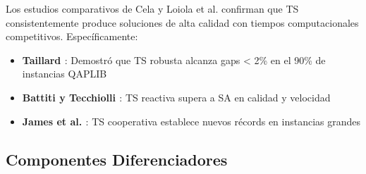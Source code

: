 \documentclass[12pt, a4paper]{article}
\begin{document}
\begin{table}[H]
\centering
\caption{Comparación de metaheurísticas para QAP basada en literatura}
\label{tab:comparacion_meta}
\end{table}

Los estudios comparativos de Cela \cite{cela1998} y Loiola et al. \cite{loiola2007} confirman que TS consistentemente produce soluciones de alta calidad con tiempos computacionales competitivos. Específicamente:

\begin{itemize}
    \item \textbf{Taillard \cite{taillard1991}}: Demostró que TS robusta alcanza gaps < 2\% en el 90\% de instancias QAPLIB
    \item \textbf{Battiti y Tecchiolli \cite{battiti1994}}: TS reactiva supera a SA en calidad y velocidad
    \item \textbf{James et al. \cite{james2009}}: TS cooperativa establece nuevos récords en instancias grandes
\end{itemize}

\subsection{Componentes Diferenciadores}
\end{document}

